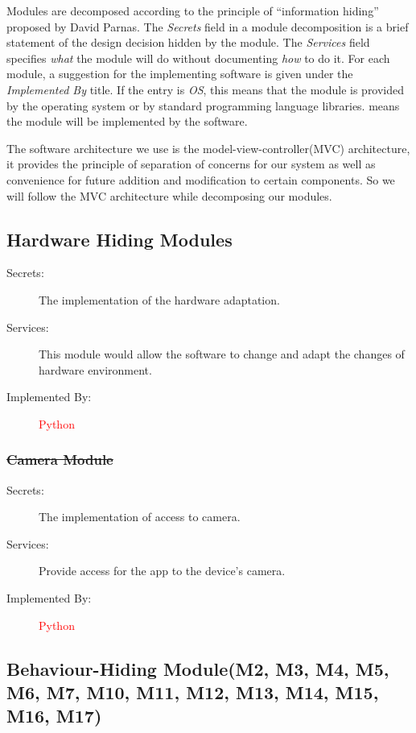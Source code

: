 \documentclass[12pt, titlepage]{article}
\begin{document}
Modules are decomposed according to the principle of ``information hiding''
proposed by David Parnas. The \emph{Secrets} field in a module
decomposition is a brief statement of the design decision hidden by the
module. The \emph{Services} field specifies \emph{what} the module will do
without documenting \emph{how} to do it. For each module, a suggestion for the
implementing software is given under the \emph{Implemented By} title. If the
entry is \emph{OS}, this means that the module is provided by the operating
system or by standard programming language libraries.  \emph{\progname{}} means the
module will be implemented by the \progname{} software.

The software architecture we use is the model-view-controller(MVC) architecture, it provides the principle of separation of concerns for our system as well as convenience for future addition and modification to certain components.
So we will follow the MVC architecture while decomposing our modules.


\subsection{Hardware Hiding Modules}

\begin{description}
\item[Secrets:]The implementation of the hardware adaptation.
\item[Services:]This module would allow the software to change and adapt the changes of hardware environment.
\item[Implemented By:] \textcolor{red}{Python}
\end{description}

\subsubsection{\sout{Camera Module }}

\begin{description}
\item[Secrets:] The implementation of access to camera.
\item[Services:] Provide access for the app to the device's camera.
\item[Implemented By:] \textcolor{red}{Python}
\end{description}

\subsection{Behaviour-Hiding Module(M2, M3, M4, M5, M6, M7, M10, M11, M12, M13, M14, M15, M16, M17)}
\end{document}
